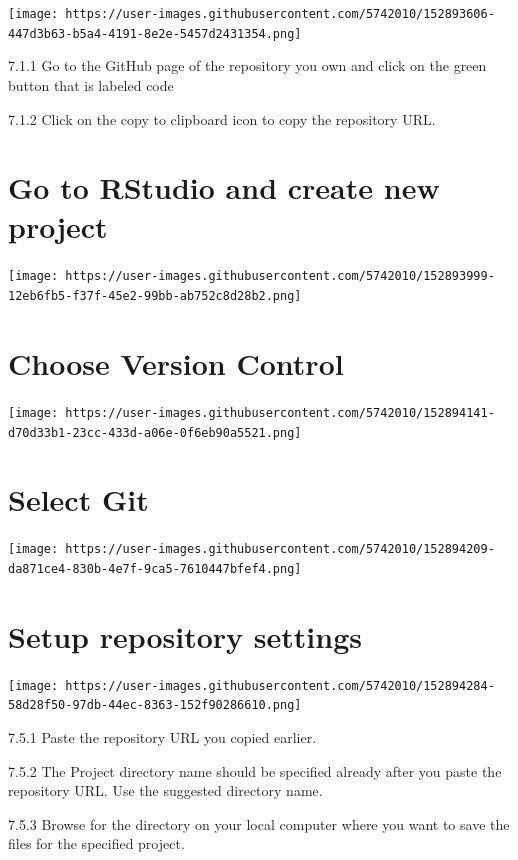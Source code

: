 \documentclass[
  12pt,
]{book}
\begin{document}
\texttt{[image: https://user-images.githubusercontent.com/5742010/152893606-447d3b63-b5a4-4191-8e2e-5457d2431354.png]}

7.1.1 Go to the GitHub page of the repository you own and click on the green button that is labeled code

7.1.2 Click on the copy to clipboard icon to copy the repository URL.

\hypertarget{go-to-rstudio-and-create-new-project}{%
\section{Go to RStudio and create new project}\label{go-to-rstudio-and-create-new-project}}

\texttt{[image: https://user-images.githubusercontent.com/5742010/152893999-12eb6fb5-f37f-45e2-99bb-ab752c8d28b2.png]}

\hypertarget{choose-version-control}{%
\section{Choose Version Control}\label{choose-version-control}}

\texttt{[image: https://user-images.githubusercontent.com/5742010/152894141-d70d33b1-23cc-433d-a06e-0f6eb90a5521.png]}

\hypertarget{select-git}{%
\section{Select Git}\label{select-git}}

\texttt{[image: https://user-images.githubusercontent.com/5742010/152894209-da871ce4-830b-4e7f-9ca5-7610447bfef4.png]}

\hypertarget{setup-repository-settings}{%
\section{Setup repository settings}\label{setup-repository-settings}}

\texttt{[image: https://user-images.githubusercontent.com/5742010/152894284-58d28f50-97db-44ec-8363-152f90286610.png]}

7.5.1 Paste the repository URL you copied earlier.

7.5.2 The Project directory name should be specified already after you paste the repository URL. Use the suggested directory name.

7.5.3 Browse for the directory on your local computer where you want to save the files for the specified project.
\end{document}

